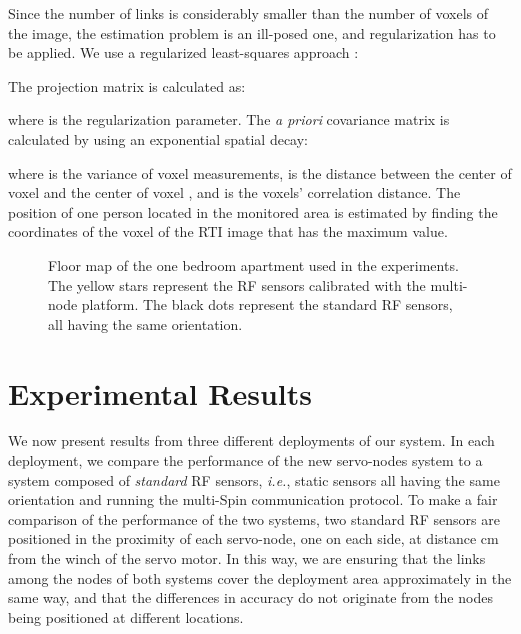 \documentclass[conference]{IEEEtran}
\begin{document}
Since the number of links  is considerably smaller than the number of voxels of the image, the estimation problem is an ill-posed one, and regularization has to be applied. We use a regularized least-squares approach \cite{Patwari_corr_shadow_2008}:

The projection matrix  is calculated as:

where  is the regularization parameter. The \emph{a priori} covariance matrix  is calculated by using an exponential spatial decay:

where  is the variance of voxel measurements,  is the distance between the center of voxel  and the center of voxel , and  is the voxels' correlation distance. The position of one person located in the monitored area is estimated by finding the coordinates of the voxel of the RTI image that has the maximum value.



\begin{figure}[t]
    \begin{center}
        \caption{Floor map of the one bedroom apartment used in the experiments. The yellow stars represent the RF sensors calibrated with the multi-node platform. The black dots represent the standard RF sensors, all having the same orientation.}
        \label{fig:apartment_nodes}
    \end{center}
\end{figure}






\section{Experimental Results}
\label{sec:experimental_results}

We now present results from three different deployments of our system. In each deployment, we compare the performance of the new servo-nodes system to a system composed of \emph{standard} RF sensors, \emph{i.e.}, static sensors all having the same orientation and running the multi-Spin communication protocol. To make a fair comparison of the performance of the two systems, two standard RF sensors are positioned in the proximity of each servo-node, one on each side, at distance  cm from the winch of the servo motor. In this way, we are ensuring that the links among the nodes of both systems cover the deployment area approximately in the same way, and that the differences in accuracy do not originate from the nodes being positioned at different locations.
\end{document}
